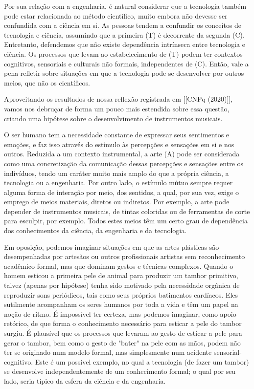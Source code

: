 Por sua relação com a engenharia, é natural considerar que a tecnologia também pode estar relacionada ao método científico, muito embora não devesse ser confundida com a ciência em si. As pessoas tendem a confundir os conceitos de tecnologia e ciência, assumindo que a primeira (T) é decorrente da segunda (C). Entretanto, defendemos que não existe dependência intrínseca entre tecnologia e ciência. Os processos que levam ao estabelecimento de (T) podem ter contextos cognitivos, sensoriais e culturais não formais, independentes de (C). Então, vale a pena refletir sobre situações em que a tecnologia pode se desenvolver por outros meios, que não os científicos.

Aproveitando os resultados de nossa reflexão registrada em  [[CNPq (2020)]], vamos nos debruçar de forma um pouco mais estendida sobre essa questão, criando uma hipótese sobre o desenvolvimento de instrumentos musicais.

O ser humano tem a necessidade constante de expressar seus sentimentos e emoções, e faz isso através do estímulo às percepções e sensações em si e nos outros. Reduzida a um contexto instrumental, a arte (A) pode ser considerada como uma concretização da comunicação dessas percepções e sensações entre os indivíduos, tendo um caráter muito mais amplo do que a própria ciência, a tecnologia ou a engenharia. Por outro lado, o estímulo mútuo sempre requer alguma forma de interação por meio, dos sentidos, a qual, por sua vez, exige o emprego de meios materiais, diretos ou indiretos. Por exemplo, a arte pode depender de instrumentos musicais, de tintas coloridas ou de ferramentas de corte para esculpir, por exemplo. Todos estes meios têm um certo grau de dependência dos conhecimentos da ciência, da engenharia e da tecnologia.

Em oposição, podemos imaginar situações em que as artes plásticas são desempenhadas por artesãos ou outros profissionais artistas sem reconhecimento acadêmico formal, mas que dominam gestos e técnicas complexos. Quando o homem esticou a primeira pele de animal para produzir um tambor primitivo, talvez (apenas por hipótese) tenha sido motivado pela necessidade orgânica de reproduzir sons periódicos, tais como seus próprios batimentos cardíacos. Eles sutilmente acompanham os seres humanos por toda a vida e têm um papel na noção de ritmo. É impossível ter certeza, mas podemos imaginar, como apoio retórico, de que forma o conhecimento necessário para esticar a pele do tambor surgiu. É plausível que os processos que levaram ao gesto de esticar a pele para gerar o tambor, bem como o gesto de "bater" na pele com as mãos, podem não ter se originado num modelo formal, mas simplesmente num acidente sensorial-cognitivo. Este é um possível exemplo, no qual a tecnologia (de fazer um tambor) se desenvolve independentemente de um conhecimento formal; o qual por seu lado, seria típico da esfera da ciência e da engenharia.

